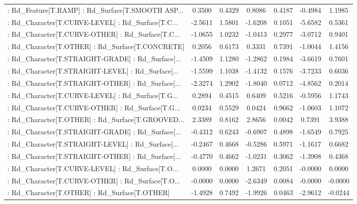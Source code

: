 \begin{longtable}{p{4cm}cccccc}
 : Rd\_Feature[T.RAMP] : Rd\_Surface[T.SMOOTH ASP... &  0.3500 &    0.4329 &  0.8086 &       0.4187 & -0.4984 &  1.1985 \\
 : Rd\_Character[T.CURVE-LEVEL] : Rd\_Surface[T.C... & -2.5611 &    1.5801 & -1.6208 &       0.1051 & -5.6582 &  0.5361 \\
 : Rd\_Character[T.CURVE-OTHER] : Rd\_Surface[T.C... & -1.0655 &    1.0232 & -1.0413 &       0.2977 & -3.0712 &  0.9401 \\
 : Rd\_Character[T.OTHER] : Rd\_Surface[T.CONCRETE]  &  0.2056 &    0.6173 &  0.3331 &       0.7391 & -1.0044 &  1.4156 \\
 : Rd\_Character[T.STRAIGHT-GRADE] : Rd\_Surface[... & -1.4509 &    1.1280 & -1.2862 &       0.1984 & -3.6619 &  0.7601 \\
 : Rd\_Character[T.STRAIGHT-LEVEL] : Rd\_Surface[... & -1.5599 &    1.1038 & -1.4132 &       0.1576 & -3.7233 &  0.6036 \\
 : Rd\_Character[T.STRAIGHT-OTHER] : Rd\_Surface[... & -2.3274 &    1.2902 & -1.8040 &       0.0712 & -4.8562 &  0.2014 \\
 : Rd\_Character[T.CURVE-LEVEL] : Rd\_Surface[T.G... &  0.2894 &    0.4515 &  0.6409 &       0.5216 & -0.5956 &  1.1743 \\
 : Rd\_Character[T.CURVE-OTHER] : Rd\_Surface[T.G... &  0.0234 &    0.5529 &  0.0424 &       0.9662 & -1.0603 &  1.1072 \\
 : Rd\_Character[T.OTHER] : Rd\_Surface[T.GROOVED... &  2.3389 &    0.8162 &  2.8656 &       0.0042 &  0.7391 &  3.9388 \\
 : Rd\_Character[T.STRAIGHT-GRADE] : Rd\_Surface[... & -0.4312 &    0.6243 & -0.6907 &       0.4898 & -1.6549 &  0.7925 \\
 : Rd\_Character[T.STRAIGHT-LEVEL] : Rd\_Surface[... & -0.2467 &    0.4668 & -0.5286 &       0.5971 & -1.1617 &  0.6682 \\
 : Rd\_Character[T.STRAIGHT-OTHER] : Rd\_Surface[... & -0.4770 &    0.4662 & -1.0231 &       0.3062 & -1.3908 &  0.4368 \\
 : Rd\_Character[T.CURVE-LEVEL] : Rd\_Surface[T.O... &  0.0000 &    0.0000 &  1.2671 &       0.2051 & -0.0000 &  0.0000 \\
 : Rd\_Character[T.CURVE-OTHER] : Rd\_Surface[T.O... & -0.0000 &    0.0000 & -2.6349 &       0.0084 & -0.0000 & -0.0000 \\
 : Rd\_Character[T.OTHER] : Rd\_Surface[T.OTHER]     & -1.4928 &    0.7492 & -1.9926 &       0.0463 & -2.9612 & -0.0244 \\

\end{longtable}
